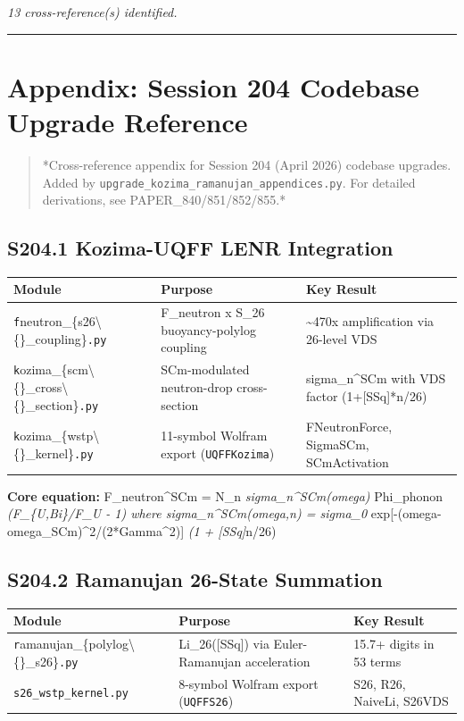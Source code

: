 \documentclass[11pt]{article}
\begin{document}
\emph{13 cross-reference(s) identified.}

\noindent\rule{\textwidth}{0.4pt}

\section*{Appendix: Session 204 Codebase Upgrade Reference}

\begin{quote}
*Cross-reference appendix for Session 204 (April 2026) codebase upgrades.
Added by \verb|upgrade_kozima_ramanujan_appendices.py|. For detailed derivations,
see PAPER\_840/851/852/855.*
\end{quote}

\subsection*{S204.1 Kozima-UQFF LENR Integration}

\begin{center}
\begin{longtable}{lll}
\toprule
Module & Purpose & Key Result \tabularnewline
\midrule
\endhead
\verb|f|neutron\_\{s26\textbackslash\{\}\_coupling\}\verb|.py| & F\_neutron x S\_26 buoyancy-polylog coupling & \textasciitilde{}470x amplification via 26-level VDS \tabularnewline
\verb|k|ozima\_\{scm\textbackslash\{\}\_cross\textbackslash\{\}\_section\}\verb|.py| & SCm-modulated neutron-drop cross-section & sigma\_n\textasciicircum{}SCm with VDS factor (1+[SSq]*n/26) \tabularnewline
\verb|k|ozima\_\{wstp\textbackslash\{\}\_kernel\}\verb|.py| & 11-symbol Wolfram export (\verb|UQFFKozima|) & FNeutronForce, SigmaSCm, SCmActivation \tabularnewline
\bottomrule
\end{longtable}
\end{center}

\textbf{Core equation:} F\_neutron\textasciicircum{}SCm = N\_n \emph{ sigma\_n\textasciicircum{}SCm(omega) } Phi\_phonon \emph{ (F\_\{U,Bi\}/F\_U - 1) where sigma\_n\textasciicircum{}SCm(omega,n) = sigma\_0 } exp[-(omega-omega\_SCm)\textasciicircum{}2/(2*Gamma\textasciicircum{}2)] \emph{ (1 + [SSq]}n/26)

\subsection*{S204.2 Ramanujan 26-State Summation}

\begin{center}
\begin{longtable}{lll}
\toprule
Module & Purpose & Key Result \tabularnewline
\midrule
\endhead
\verb|r|amanujan\_\{polylog\textbackslash\{\}\_s26\}\verb|.py| & Li\_26([SSq]) via Euler-Ramanujan acceleration & 15.7+ digits in 53 terms \tabularnewline
\verb|s26_wstp_kernel.py| & 8-symbol Wolfram export (\verb|UQFFS26|) & S26, R26, NaiveLi, S26VDS \tabularnewline
\bottomrule
\end{longtable}
\end{center}
\end{document}
